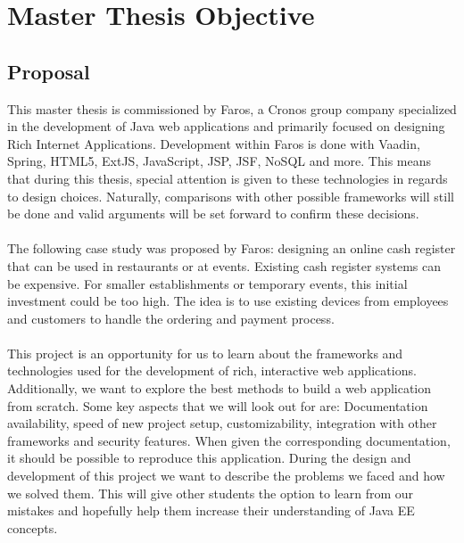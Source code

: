 \documentclass[12pt]{article}
\begin{document}
\section{Master Thesis Objective}
\begin{multicols}{2}
\subsection{Proposal}
This master thesis is commissioned by Faros, a Cronos group company specialized in the development of Java web applications and primarily focused on designing Rich Internet Applications. Development within Faros is done with Vaadin, Spring, HTML5, ExtJS, JavaScript, JSP, JSF, NoSQL and more.\cite{farosProposal} This means that during this thesis, special attention is given to these technologies in regards to design choices. Naturally, comparisons with other possible frameworks will still be done and valid arguments will be set forward to confirm these decisions.
\\\\
The following case study was proposed by Faros: designing an online cash register that can be used in restaurants or at events. Existing cash register systems can be expensive. For smaller establishments or temporary events, this initial investment could be too high. The idea is to use existing devices from employees and customers to handle the ordering and payment process.
\\\\
This project is an opportunity for us to learn about the frameworks and technologies used for the development of rich, interactive web applications. Additionally, we want to explore the best methods to  build a web application from scratch. Some key aspects that we will look out for are: Documentation availability, speed of new project setup, customizability, integration with other frameworks and security features. When given the corresponding documentation, it should be possible to reproduce this application. During the design and development of this project we want to describe the problems we faced and how we solved them. This will give other students the option to learn from our mistakes and hopefully help them increase their understanding of Java EE concepts. 


\end{multicols}
\end{document}
